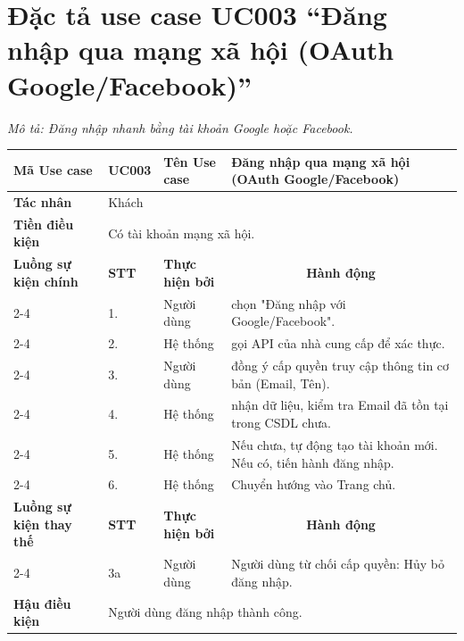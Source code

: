 \section{Đặc tả use case UC003 ``Đăng nhập qua mạng xã hội (OAuth Google/Facebook)''}
\textit{Mô tả: Đăng nhập nhanh bằng tài khoản Google hoặc Facebook.}
\vspace{0.5cm}

\begingroup
\renewcommand{\arraystretch}{1.5}

\begin{longtable}{|p{2.7cm}|p{0.8cm}|p{2.6cm}|p{7.3cm}|}
\hline
\cellcolor[HTML]{D5F5E3}\textbf{Mã Use case} & \multicolumn{1}{l|}{UC003} & \cellcolor[HTML]{D5F5E3}\textbf{Tên Use case} & Đăng nhập qua mạng xã hội (OAuth Google/Facebook) \\ \hline
\cellcolor[HTML]{D5F5E3}\textbf{Tác nhân} & \multicolumn{3}{p{10.7cm}|}{Khách} \\ \hline
\cellcolor[HTML]{D5F5E3}\textbf{Tiền điều kiện} & \multicolumn{3}{p{10.7cm}|}{Có tài khoản mạng xã hội.} \\ \hline

\cellcolor[HTML]{D5F5E3}\textbf{Luồng sự kiện chính} & \cellcolor[HTML]{FDEBD0}\textbf{STT} & \cellcolor[HTML]{FDEBD0}\textbf{Thực hiện bởi} & \multicolumn{1}{c|}{\cellcolor[HTML]{FDEBD0}\textbf{Hành động}} \\ \cline{2-4} 
\cellcolor[HTML]{D5F5E3} & 1. & Người dùng & chọn "Đăng nhập với Google/Facebook". \\ \cline{2-4} 
\cellcolor[HTML]{D5F5E3} & 2. & Hệ thống & gọi API của nhà cung cấp để xác thực. \\ \cline{2-4} 
\cellcolor[HTML]{D5F5E3} & 3. & Người dùng & đồng ý cấp quyền truy cập thông tin cơ bản (Email, Tên). \\ \cline{2-4} 
\cellcolor[HTML]{D5F5E3} & 4. & Hệ thống & nhận dữ liệu, kiểm tra Email đã tồn tại trong CSDL chưa. \\ \cline{2-4} 
\cellcolor[HTML]{D5F5E3} & 5. & Hệ thống & Nếu chưa, tự động tạo tài khoản mới. Nếu có, tiến hành đăng nhập. \\ \cline{2-4} 
\cellcolor[HTML]{D5F5E3} & 6. & Hệ thống & Chuyển hướng vào Trang chủ. \\ \hline

\cellcolor[HTML]{D5F5E3}\textbf{Luồng sự kiện thay thế} & \cellcolor[HTML]{FDEBD0}\textbf{STT} & \cellcolor[HTML]{FDEBD0}\textbf{Thực hiện bởi} & \multicolumn{1}{c|}{\cellcolor[HTML]{FDEBD0}\textbf{Hành động}} \\ \cline{2-4} 
\cellcolor[HTML]{D5F5E3} & 3a & Người dùng & Người dùng từ chối cấp quyền: Hủy bỏ đăng nhập. \\ \hline

\cellcolor[HTML]{D5F5E3}\textbf{Hậu điều kiện} & \multicolumn{3}{p{10.7cm}|}{Người dùng đăng nhập thành công.} \\ \hline
\end{longtable}
